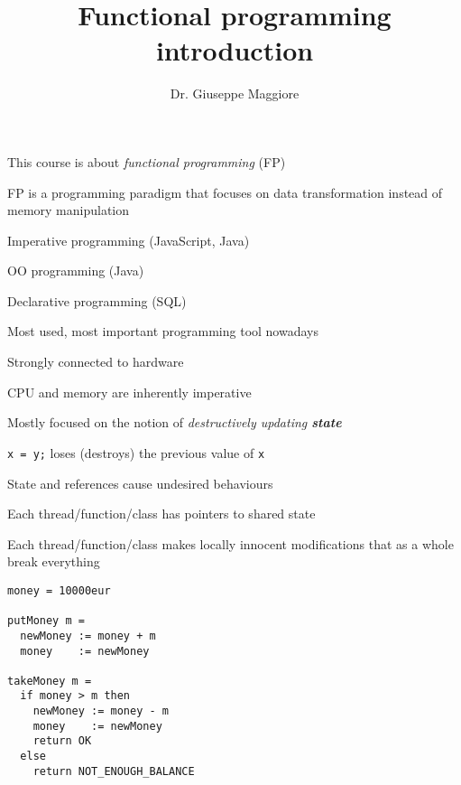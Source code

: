 \documentclass{beamer}
\title{Functional programming introduction}
\author{Dr. Giuseppe Maggiore}
\institute{Hogeschool Rotterdam \\ 
Rotterdam, Netherlands}
\date{}
\begin{document}
\maketitle

\begin{slide}{
\item This course is about \textit{functional programming} (FP)
\item FP is a programming paradigm that focuses on data transformation instead of memory manipulation
}\end{slide}

\begin{slide}{
\item Imperative programming (JavaScript, Java)
\item OO programming (Java)
\item Declarative programming (SQL)
}\end{slide}

\begin{slide}{
\item Most used, most important programming tool nowadays
\item Strongly connected to hardware
\item CPU and memory are inherently imperative
}\end{slide}

\begin{slide}{
\item Mostly focused on the notion of \textit{destructively updating \textbf{state}}
\item \texttt{x = y;} loses (destroys) the previous value of \texttt{x}
}\end{slide}

\begin{slide}{
\item State and references cause undesired behaviours
\item Each thread/function/class has pointers to shared state
\item Each thread/function/class makes locally innocent modifications that as a whole break everything
}\end{slide}

\begin{frame}[fragile]
\begin{lstlisting}
money = 10000eur

putMoney m =
  newMoney := money + m
  money    := newMoney
  
takeMoney m =
  if money > m then
    newMoney := money - m
    money    := newMoney
    return OK
  else
    return NOT_ENOUGH_BALANCE
\end{lstlisting}
\end{frame}
\end{document}
